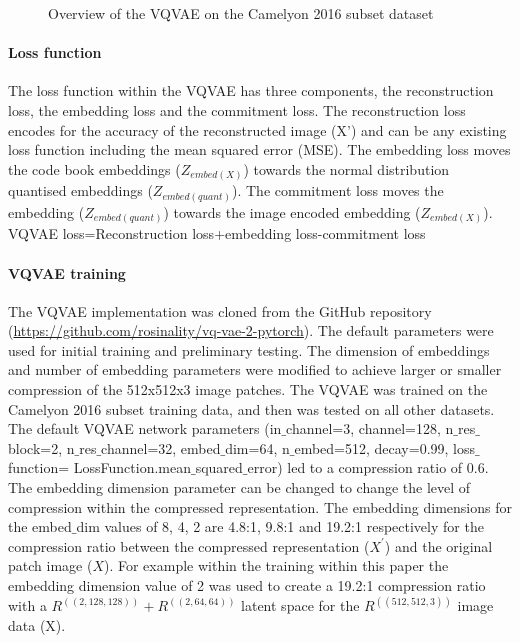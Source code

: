 \documentclass[review]{elsarticle}
\begin{document}
\begin{figure}
    \centering
    \caption{Overview of the VQVAE on the Camelyon 2016 subset dataset}
    \label{fig:VQVAE_camelyon_2016_overview_diagram}
\end{figure}

\paragraph{Loss function} The loss function within the VQVAE has three components, the reconstruction loss, the embedding loss and the commitment loss. The reconstruction loss encodes for the accuracy of the reconstructed image (X') and can be any existing loss function including the mean squared error (MSE). The embedding loss moves the code book embeddings ($Z_{embed(X)}$) towards the normal distribution quantised embeddings ($Z_{embed(quant)}$). The commitment loss moves the embedding ($Z_{embed(quant)}$) towards the image encoded embedding ($Z_{embed(X)}$). \\
    VQVAE loss=Reconstruction loss+embedding loss-commitment loss
    
\paragraph{VQVAE training} The VQVAE implementation was cloned from the GitHub repository (\url{https://github.com/rosinality/vq-vae-2-pytorch}). The default parameters were used for initial training and preliminary testing. The dimension of embeddings and number of embedding parameters were modified to achieve larger or smaller compression of the 512x512x3 image patches. The VQVAE was trained on the Camelyon 2016 subset training data, and then was tested on all other datasets.\\
The default VQVAE network parameters (in$\_$channel=3, channel=128, n$\_$res$\_$block=2, n$\_$res$\_$channel=32, embed$\_$dim=64, n$\_$embed=512, decay=0.99, loss$\_$function= LossFunction.mean$\_$squared$\_$error) led to a compression ratio of 0.6. The embedding dimension parameter can be changed to change the level of compression within the compressed representation. The embedding dimensions for the embed$\_$dim values of 8, 4, 2 are 4.8:1, 9.8:1 and 19.2:1 respectively for the compression ratio between the compressed representation ($X^{'}$) and the original patch image ($X$). For example within the training within this paper the embedding dimension value of 2 was used to create a 19.2:1 compression ratio with a $R^{((2,128,128))}+R^{((2,64,64))}$ latent space for the $R^{((512,512,3))}$ image data (X).
\end{document}
